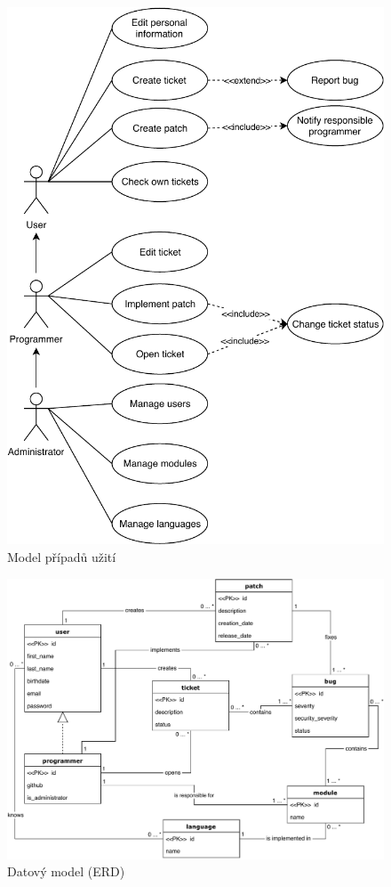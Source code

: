 \documentclass[11pt, a4paper]{article}
\begin{document}
	\begin{figure}[ht]
		\centering
		\vspace{-3cm}
		\includegraphics[width=1 \linewidth]{use_case_diagram.pdf}
		\caption{Model případů užití}
	\end{figure}

	\begin{landscape}
		\begin{figure}[ht]
			\centering
			\includegraphics[width=0.85 \linewidth]{er_diagram.pdf}
			\caption{Datový model (ERD)}
		\end{figure}
	\end{landscape}
\end{document}
